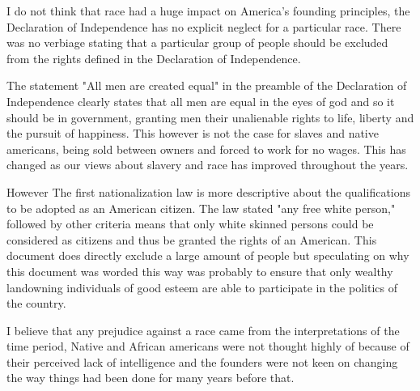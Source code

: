 I do not think that race had a huge impact on America's
founding principles, the Declaration of Independence has
no explicit
neglect for a particular race. There was no verbiage
stating that a particular group of people should be
excluded from the rights defined in the Declaration
of Independence. 

The statement "All men are created equal" in the preamble of
the Declaration of Independence clearly states that all
men are equal in the eyes of god and so it should be in
government, granting men their unalienable rights to life,
liberty and the pursuit of happiness. This however is not
the case for slaves and native americans, being sold between
owners and forced to work for no wages. This has
changed as our views about slavery and race has improved
throughout the years.

However The first nationalization law is more descriptive about the
qualifications to be adopted as an American citizen. 
The law stated "any free white person," followed by other
criteria means that only white skinned persons could be considered
as citizens and thus be granted the rights of an American. This
document does directly exclude a large amount of people but
speculating on why this document was worded this way was probably
to ensure that only wealthy landowning individuals of good esteem 
are able to participate in the politics of the country.

I believe that any
prejudice against a race came from the interpretations
of the time period, Native and African americans were not
thought highly of because of their perceived lack of intelligence
and the founders were not keen on changing the way things
had been done for many years before that.